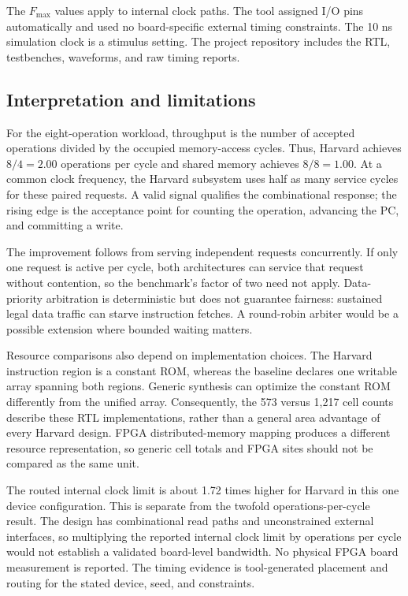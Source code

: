 \documentclass[conference]{IEEEtran}
\begin{document}
The \(F_{\max}\) values apply to internal clock paths. The tool assigned I/O pins automatically and used no board-specific external timing constraints. The 10 ns simulation clock is a stimulus setting. The project repository includes the RTL, testbenches, waveforms, and raw timing reports.

\subsection{Interpretation and limitations}
For the eight-operation workload, throughput is the number of accepted operations divided by the occupied memory-access cycles. Thus, Harvard achieves $8/4=2.00$ operations per cycle and shared memory achieves $8/8=1.00$. At a common clock frequency, the Harvard subsystem uses half as many service cycles for these paired requests. A valid signal qualifies the combinational response; the rising edge is the acceptance point for counting the operation, advancing the PC, and committing a write.

The improvement follows from serving independent requests concurrently. If only one request is active per cycle, both architectures can service that request without contention, so the benchmark's factor of two need not apply. Data-priority arbitration is deterministic but does not guarantee fairness: sustained legal data traffic can starve instruction fetches. A round-robin arbiter would be a possible extension where bounded waiting matters.

Resource comparisons also depend on implementation choices. The Harvard instruction region is a constant ROM, whereas the baseline declares one writable array spanning both regions. Generic synthesis can optimize the constant ROM differently from the unified array. Consequently, the 573 versus 1,217 cell counts describe these RTL implementations, rather than a general area advantage of every Harvard design. FPGA distributed-memory mapping produces a different resource representation, so generic cell totals and FPGA sites should not be compared as the same unit.

The routed internal clock limit is about 1.72 times higher for Harvard in this one device configuration. This is separate from the twofold operations-per-cycle result. The design has combinational read paths and unconstrained external interfaces, so multiplying the reported internal clock limit by operations per cycle would not establish a validated board-level bandwidth. No physical FPGA board measurement is reported. The timing evidence is tool-generated placement and routing for the stated device, seed, and constraints.
\end{document}
